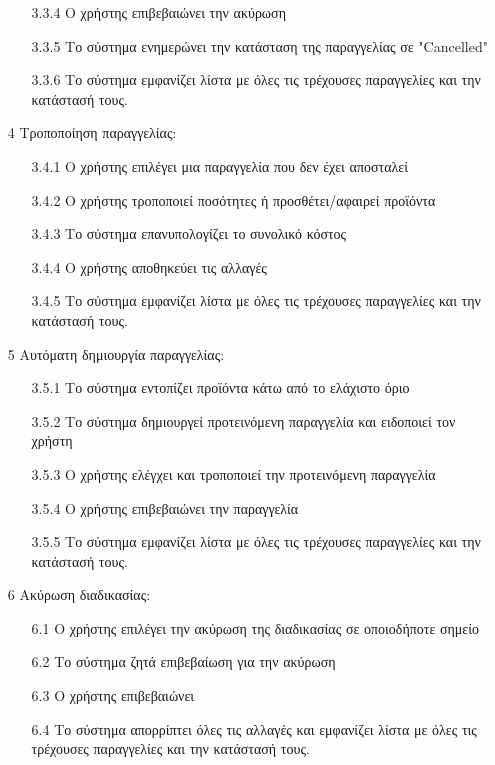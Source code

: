 \documentclass[12pt,a4paper,twoside]{book}
\begin{document}
\begin{enumerate}
\begin{enumerate}
          \item[3.3.4 ] Ο χρήστης επιβεβαιώνει την ακύρωση
          \item[3.3.5 ] Το σύστημα ενημερώνει την κατάσταση της παραγγελίας σε "Cancelled" %
          \item[3.3.6] Το σύστημα εμφανίζει λίστα με όλες τις τρέχουσες παραγγελίες και την κατάστασή τους.
        \end{enumerate}
  \item[4 ] Τροποποίηση παραγγελίας:
        \begin{enumerate}
          \item[3.4.1 ] Ο χρήστης επιλέγει μια παραγγελία που δεν έχει αποσταλεί
          \item[3.4.2 ] Ο χρήστης τροποποιεί ποσότητες ή προσθέτει/αφαιρεί προϊόντα
          \item[3.4.3 ] Το σύστημα επανυπολογίζει το συνολικό κόστος
          \item[3.4.4 ] Ο χρήστης αποθηκεύει τις αλλαγές
          \item[3.4.5 ] Το σύστημα εμφανίζει λίστα με όλες τις τρέχουσες παραγγελίες και την κατάστασή τους.
        \end{enumerate}
  \item[5 ] Αυτόματη δημιουργία παραγγελίας:
        \begin{enumerate}
          \item[3.5.1 ] Το σύστημα εντοπίζει προϊόντα κάτω από το ελάχιστο όριο
          \item[3.5.2 ] Το σύστημα δημιουργεί προτεινόμενη παραγγελία και ειδοποιεί τον χρήστη
          \item[3.5.3 ] Ο χρήστης ελέγχει και τροποποιεί την προτεινόμενη παραγγελία
          \item[3.5.4 ] Ο χρήστης επιβεβαιώνει την παραγγελία
          \item[3.5.5 ] Το σύστημα εμφανίζει λίστα με όλες τις τρέχουσες παραγγελίες και την κατάστασή τους.
        \end{enumerate}
  \item[6 ] Ακύρωση διαδικασίας:
        \begin{enumerate}
          \item[6.1 ] Ο χρήστης επιλέγει την ακύρωση της διαδικασίας σε οποιοδήποτε σημείο
          \item[6.2 ] Το σύστημα ζητά επιβεβαίωση για την ακύρωση
          \item[6.3 ] Ο χρήστης επιβεβαιώνει
          \item[6.4 ] Το σύστημα απορρίπτει όλες τις αλλαγές και εμφανίζει λίστα με όλες τις τρέχουσες παραγγελίες και την κατάστασή τους.

\end{enumerate}
\end{enumerate}
\end{document}
